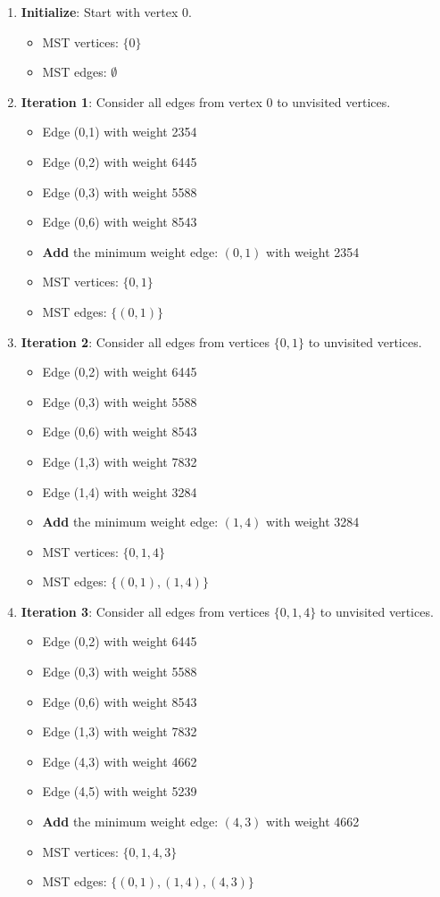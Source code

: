\documentclass{article}
\theoremstyle{definition}
\begin{document}
\begin{enumerate}
\item \textbf{Initialize}: Start with vertex 0.
   \begin{itemize}
   \item MST vertices: $\{0\}$
   \item MST edges: $\emptyset$
   \end{itemize}

\item \textbf{Iteration 1}: Consider all edges from vertex 0 to unvisited vertices.
   \begin{itemize}
   \item Edge (0,1) with weight 2354
   \item Edge (0,2) with weight 6445
   \item Edge (0,3) with weight 5588
   \item Edge (0,6) with weight 8543
   \item \textbf{Add} the minimum weight edge: $(0,1)$ with weight 2354
   \item MST vertices: $\{0,1\}$
   \item MST edges: $\{(0,1)\}$
   \end{itemize}

\item \textbf{Iteration 2}: Consider all edges from vertices $\{0,1\}$ to unvisited vertices.
   \begin{itemize}
   \item Edge (0,2) with weight 6445
   \item Edge (0,3) with weight 5588
   \item Edge (0,6) with weight 8543
   \item Edge (1,3) with weight 7832
   \item Edge (1,4) with weight 3284
   \item \textbf{Add} the minimum weight edge: $(1,4)$ with weight 3284
   \item MST vertices: $\{0,1,4\}$
   \item MST edges: $\{(0,1), (1,4)\}$
   \end{itemize}

\item \textbf{Iteration 3}: Consider all edges from vertices $\{0,1,4\}$ to unvisited vertices.
   \begin{itemize}
   \item Edge (0,2) with weight 6445
   \item Edge (0,3) with weight 5588
   \item Edge (0,6) with weight 8543
   \item Edge (1,3) with weight 7832
   \item Edge (4,3) with weight 4662
   \item Edge (4,5) with weight 5239
   \item \textbf{Add} the minimum weight edge: $(4,3)$ with weight 4662
   \item MST vertices: $\{0,1,4,3\}$
   \item MST edges: $\{(0,1), (1,4), (4,3)\}$
   \end{itemize}


\end{enumerate}
\end{document}
